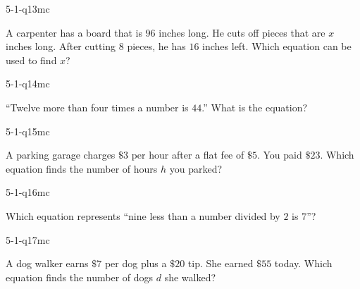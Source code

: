 \begin{practiceQuestion}{5-1-q13}{mc}
\begin{questionText}
A carpenter has a board that is $96$ inches long. He cuts off pieces that are $x$ inches long. After cutting $8$ pieces, he has $16$ inches left. Which equation can be used to find $x$?
\end{questionText}
\end{practiceQuestion}

\begin{practiceQuestion}{5-1-q14}{mc}
\begin{questionText}
``Twelve more than four times a number is $44$.'' What is the equation?
\end{questionText}
\end{practiceQuestion}

\begin{practiceQuestion}{5-1-q15}{mc}
\begin{questionText}
A parking garage charges $\$3$ per hour after a flat fee of $\$5$. You paid $\$23$. Which equation finds the number of hours $h$ you parked?
\end{questionText}
\end{practiceQuestion}

\begin{practiceQuestion}{5-1-q16}{mc}
\begin{questionText}
Which equation represents ``nine less than a number divided by $2$ is $7$''?
\end{questionText}
\end{practiceQuestion}

\begin{practiceQuestion}{5-1-q17}{mc}
\begin{questionText}
A dog walker earns $\$7$ per dog plus a $\$20$ tip. She earned $\$55$ today. Which equation finds the number of dogs $d$ she walked?
\end{questionText}
\end{practiceQuestion}

